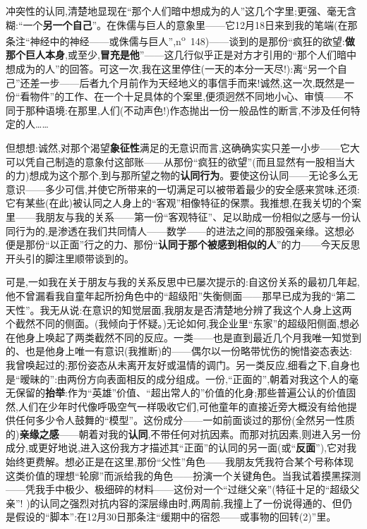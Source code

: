 冲突性的认同,清楚地显现在“那个人们暗中想成为的人”\dmark{}这几个字里;更强、毫无含糊:“一个\textbf{另一个自己}”。在侏儒与巨人的意象里——它12月18日来到我的笔端(在那条注“神经中的神经——或侏儒与巨人”,n\textsuperscript{o}~148)——谈到的是那份“疯狂的欲望:\textbf{做那个巨人本身},或至少,\textbf{冒充是他}”——这几行似乎正是对方才引用的“那个人们暗中想成为的人”的回答。可这一次,我在这里停住(一天的本分一天尽!):离“另一个自己”还差一步——后者九个月前作为天经地义的事信手而来!诚然,这一次,既然是一份“看物件”的工作、在一个十足具体的个案里,便须迥然不同地小心、审慎——不同于那种语境:在那里,人们(不动声色!)作态抛出一份一般品性的断言,不涉及任何特定的人……

但想想:诚然,对那个渴望\textbf{象征性}满足的无意识而言,这确确实实只差一小步——它大可以凭自己制造的意象付这部账——从那份“疯狂的欲望”(而且显然有一股相当大的力)想成为这个那个,到与那所望之物的\textbf{认同行为}。要使这份认同——无论多么无意识——多少可信,并使它所带来的一切满足可以被带着最少的安全感来赏味,还须:它有某些(在此)被认同之人身上的“客观”相像特征的保票。我推想,在我关切的个案里——我朋友与我的关系——第一份“客观特征”、足以助成一份相似之感与一份认同行为的,是渗透在我们共同情人——数学——的进法之间的那股强亲缘。这想必便是那份“以正面”行之的力、那份“\textbf{认同于那个被感到相似的人}”的力——今天反思开头引的脚注里顺带谈到的。

可是,一如我在关于朋友与我的关系反思中已屡次提示的:自这份关系的最初几年起,他不曾漏看我自童年起所扮角色中的“超级阳”失衡侧面——那早已成为我的“第二天性”。我无从说:在意识的知觉层面,我朋友是否清楚地分辨了我这个人身上这两个截然不同的侧面。(我倾向于怀疑。)无论如何,我企业里“东家”的超级阳侧面,想必在他身上唤起了\dmark{}两类截然不同的反应。一类——也是直到最近几个月我唯一知觉到的、也是他身上唯一有意识(我推断)的——偶尔以一份略带忧伤的惋惜姿态表达:我曾唤起过的;那份姿态从未离开友好或温情的调门。另一类反应,细看之下,自身也是“暧昧的”:由两份方向表面相反的成分组成。一份,“正面的”,朝着对我这个人的毫无保留的\textbf{抬举}:作为“英雄”价值、“超出常人的”价值的化身;那些普遍公认的价值固然,人们在少年时代像呼吸空气一样吸收它们,可他童年的直接近旁大概没有给他提供任何多少令人鼓舞的“模型”。这份成分——一如前面谈过的那份(全然另一性质的)\textbf{亲缘之感}——朝着对我的\textbf{认同},不带任何对抗因素。而那对抗因素,则进入另一份成分,或更好地说,进入这份我方才描述其“正面”的认同的另一面(或“\textbf{反面}”),它对我始终更费解。想必正是在这里,那份“父性”角色——我朋友凭我符合某个号称体现这类价值的理想“轮廓”而派给我的角色——扮演一个关键角色。当我试着摸黑探测——凭我手中极少、极细碎的材料——这份对一个“过继父亲”(特征十足的“超级父亲”! )的认同之强烈对抗内容的深层缘由时,两周前,我撞上了一份说得通的、但仍是假设的“脚本”:在12月30日那条注“缓期中的宿怨——或事物的回转(2)”里。

